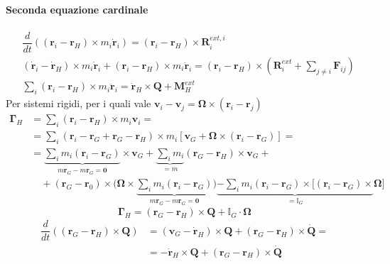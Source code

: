 \paragraph{Seconda equazione cardinale}
\begin{equation}
\begin{aligned}
    & \dfrac{d}{dt} \left( (\mathbf{r}_i-\mathbf{r}_H) \times m_i \dot{\mathbf{r}}_i \right) = (\mathbf{r}_i-\mathbf{r}_H) \times \mathbf{R}^{ext,i}_i \\
    & ( \dot{\mathbf{r}}_i - \dot{\mathbf{r}}_H ) \times m_i \dot{\mathbf{r}}_i + (\mathbf{r}_i-\mathbf{r}_H) \times m_i \ddot{\mathbf{r}}_i =  (\mathbf{r}_i-\mathbf{r}_H) \times \left( \mathbf{R}^{ext}_i + \sum_{j\ne i} \mathbf{F}_{ij} \right) \\
    & \sum_i (\mathbf{r}_i-\mathbf{r}_H) \times m_i \ddot{\mathbf{r}}_i = \dot{\mathbf{r}}_H \times \mathbf{Q} + \mathbf{M}_H^{ext}
\end{aligned}
\end{equation}
%
Per sistemi rigidi, per i quali vale $\mathbf{v}_i - \mathbf{v}_j = \mathbf{\Omega} \times (\mathbf{r}_i - \mathbf{r}_j)$
\begin{equation}
\begin{aligned}
    \mathbf{\Gamma}_H & = \sum_{i} \left( \mathbf{r}_i - \mathbf{r}_H \right) \times m_i \mathbf{v}_i = \\
    & = \sum_i \left( \mathbf{r}_i - \mathbf{r}_G + \mathbf{r}_G - \mathbf{r}_H \right) \times m_i \left[ \mathbf{v}_G + \mathbf{\Omega} \times (\mathbf{r}_i - \mathbf{r}_G) \right] = \\
    & = \underbrace{\sum_i m_i (\mathbf{r}_i - \mathbf{r}_G)}_{m \mathbf{r}_G - m \mathbf{r}_G=\mathbf{0}} \times \mathbf{v}_G +
        \underbrace{\sum_i m_i}_{=m} (\mathbf{r}_G - \mathbf{r}_H) \times \mathbf{v}_G + \\
    & \quad + (\mathbf{r}_G - \mathbf{r}_0) \times \bigg( \mathbf{\Omega} \times \underbrace{\sum_i m_i (\mathbf{r}_i - \mathbf{r}_G)}_{m \mathbf{r}_G - m \mathbf{r}_G=\mathbf{0}} \bigg)
    \underbrace{- \sum_i m_i (\mathbf{r}_i - \mathbf{r}_G ) \times [ (\mathbf{r}_i - \mathbf{r}_G ) \times }_{=\mathbb{I}_G} \mathbf{\Omega} ]
\end{aligned}
\end{equation}
\begin{equation}
    \mathbf{\Gamma}_H = (\mathbf{r}_G - \mathbf{r}_H) \times \mathbf{Q} + \mathbb{I}_G \cdot \mathbf{\Omega}
\end{equation}
\begin{equation}
\begin{aligned}
    \dfrac{d}{dt} \left( (\mathbf{r}_G - \mathbf{r}_H) \times \mathbf{Q}  \right) & = ( \mathbf{v}_G - \dot{\mathbf{r}}_H ) \times \mathbf{Q} + (\mathbf{r}_G - \mathbf{r}_H) \times \dot{\mathbf{Q}} = \\
    & = - \dot{\mathbf{r}}_H \times \mathbf{Q} + (\mathbf{r}_G - \mathbf{r}_H) \times \dot{\mathbf{Q}}
\end{aligned}
\end{equation}
